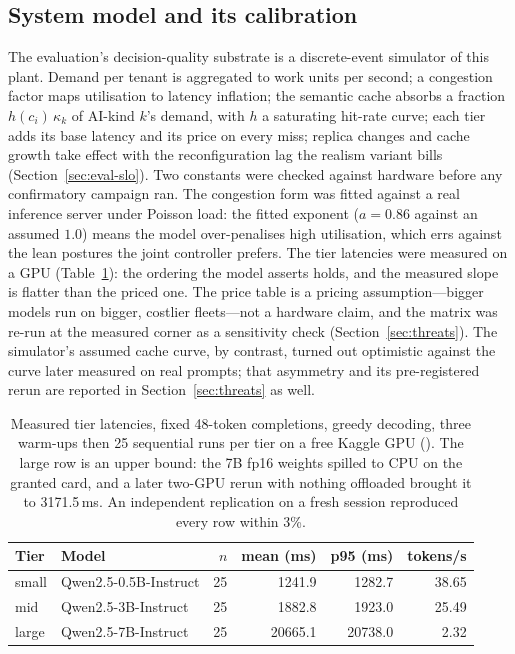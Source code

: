 \subsection{System model and its calibration}
\label{sec:system-model}

The evaluation's decision-quality substrate is a discrete-event simulator
of this plant. Demand per tenant is aggregated to work units per second; a
congestion factor maps utilisation to latency inflation; the semantic cache
absorbs a fraction $h(c_i)\,\kappa_k$ of AI-kind $k$'s demand, with $h$ a
saturating hit-rate curve; each tier adds its base latency and its price on
every miss; replica changes and cache growth take effect with the
reconfiguration lag the realism variant bills (Section~\ref{sec:eval-slo}).
Two constants were checked against hardware before any confirmatory
campaign ran. The congestion form was fitted against a real inference
server under Poisson load: the fitted exponent ($a = 0.86$ against an
assumed $1.0$) means the model over-penalises high utilisation, which errs
against the lean postures the joint controller prefers. The tier latencies
were measured on a GPU (Table~\ref{tab:tiers}): the ordering the model
asserts holds, and the measured slope is flatter than the priced one. The
price table is a pricing assumption---bigger models run on bigger,
costlier fleets---not a hardware claim, and the matrix was re-run at the
measured corner as a sensitivity check (Section~\ref{sec:threats}). The
simulator's assumed cache curve, by contrast, turned out optimistic against
the curve later measured on real prompts; that asymmetry and its
pre-registered rerun are reported in Section~\ref{sec:threats} as well.

\begin{table}[htbp]
\centering\tablefont
\begin{tabular}{@{}llrrrr@{}}
\toprule
\textbf{Tier} & \textbf{Model} & $n$ & \textbf{mean (ms)} & \textbf{p95 (ms)} & \textbf{tokens/s} \\
\midrule
small & Qwen2.5-0.5B-Instruct & 25 & 1241.9 & 1282.7 & 38.65 \\
mid   & Qwen2.5-3B-Instruct   & 25 & 1882.8 & 1923.0 & 25.49 \\
large & Qwen2.5-7B-Instruct   & 25 & 20665.1 & 20738.0 & 2.32 \\
\bottomrule
\end{tabular}
\caption{Measured tier latencies, fixed 48-token completions, greedy
decoding, three warm-ups then 25 sequential runs per tier on a free Kaggle
GPU (). The large row is an
upper bound: the 7B fp16 weights spilled to CPU on the granted card, and a
later two-GPU rerun with nothing offloaded brought it to 3171.5\,ms. An
independent replication on a fresh session reproduced every row within
3\%.}
\label{tab:tiers}
\end{table}

